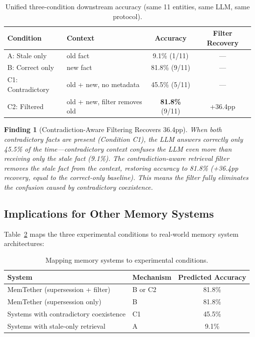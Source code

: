\documentclass{article}
\newtheorem{finding}{Finding}
\begin{document}
\begin{table}[h]
\centering
\caption{Unified three-condition downstream accuracy (same 11 entities, same LLM, same protocol).}
\label{tab:unified}
\begin{tabular}{llcc}
\toprule
Condition & Context & Accuracy & Filter Recovery \\
\midrule
A: Stale only & old fact & 9.1\% (1/11) & --- \\
B: Correct only & new fact & 81.8\% (9/11) & --- \\
C1: Contradictory & old + new, no metadata & 45.5\% (5/11) & --- \\
C2: Filtered & old + new, filter removes old & \textbf{81.8\%} (9/11) & +36.4pp \\
\bottomrule
\end{tabular}
\end{table}

\begin{finding}[Contradiction-Aware Filtering Recovers 36.4pp]
When both contradictory facts are present (Condition C1), the LLM answers correctly only 45.5\% of the time---contradictory context confuses the LLM even more than receiving only the stale fact (9.1\%). The contradiction-aware retrieval filter removes the stale fact from the context, restoring accuracy to 81.8\% (+36.4pp recovery, equal to the correct-only baseline). This means the filter fully eliminates the confusion caused by contradictory coexistence.
\end{finding}

\subsection{Implications for Other Memory Systems}

Table~\ref{tab:mapping} maps the three experimental conditions to real-world memory system architectures:

\begin{table}[h]
\centering
\caption{Mapping memory systems to experimental conditions.}
\label{tab:mapping}
\begin{tabular}{llc}
\toprule
System & Mechanism & Predicted Accuracy \\
\midrule
MemTether (supersession + filter) & B or C2 & 81.8\% \\
MemTether (supersession only) & B & 81.8\% \\
Systems with contradictory coexistence & C1 & 45.5\% \\
Systems with stale-only retrieval & A & 9.1\% \\
\bottomrule
\end{tabular}
\end{table}
\end{document}

